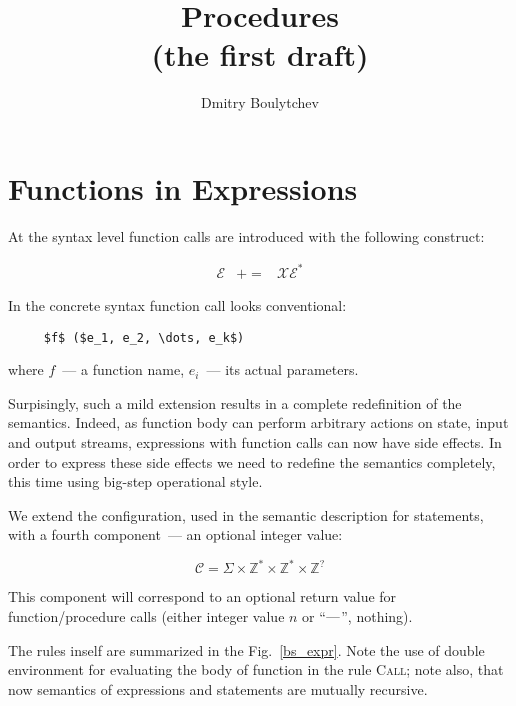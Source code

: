 \documentclass{article}
\title{Procedures\\

  (the first draft)
}
\author{Dmitry Boulytchev}
\def\transarrow{\xrightarrow}
\newcommand{\setarrow}[1]{\def\transarrow{#1}}
\def\subarrow{}
\newcommand{\setsubarrow}[1]{\def\subarrow{#1}}
\newcommand{\rulename}[1]{\textsc{#1}}
\theoremstyle{definition}
\begin{document}
\maketitle

\section{Functions in Expressions}

At the syntax level function calls are introduced with the following construct: 

\[
\begin{array}{rcl}
  \mathscr E & += & \mathscr X \mathscr E^*
\end{array}
\]

In the concrete syntax function call looks conventional:

\begin{lstlisting}
     $f$ ($e_1, e_2, \dots, e_k$)
\end{lstlisting}

where $f$~--- a function name, $e_i$~--- its actual parameters.

Surpisingly, such a mild extension results in a complete redefinition of the semantics. Indeed, as function body can perform
arbitrary actions on state, input and output streams, expressions with function calls can now have side effects. In order to express these
side effects we need to redefine the semantics completely, this time using big-step operational style.

We extend the configuration, used in the semantic description for statements, with a fourth component~--- an optional integer value:

\[
\mathscr C = \Sigma \times \mathbb Z^* \times \mathbb Z^* \times \mathbb Z^?
\]

This component will correspond to an optional return value for function/procedure calls (either integer value $n$ or ``$\hbox{---}$'', nothing).

The rules inself are summarized in the Fig.~\ref{bs_expr}. Note the use of double environment for evaluating the body of function in the rule
\rulename{Call}; note also, that now semantics of expressions and statements are mutually recursive.

\setarrow{\xRightarrow}
\setsubarrow{_{\mathscr E}}
\end{document}
